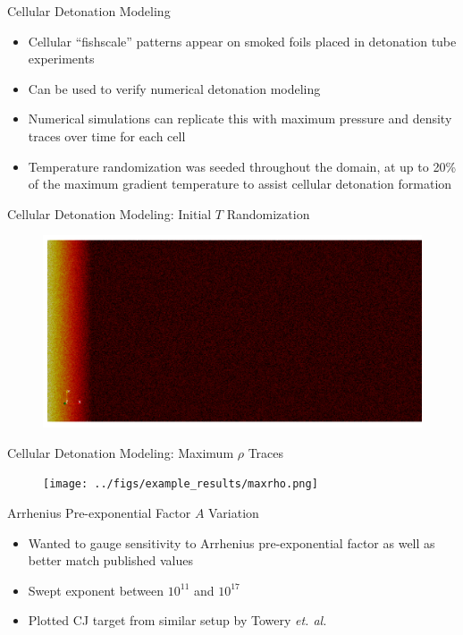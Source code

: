 \begin{frame}{Cellular Detonation Modeling}
\begin{itemize}
\item Cellular ``fishscale'' patterns appear on smoked foils placed in detonation tube experiments
\item Can be used to verify numerical detonation modeling 
\item Numerical simulations can replicate this with maximum pressure and density traces over time for each cell
\item Temperature randomization was seeded throughout the domain, at up to 20\% of the maximum gradient temperature to assist cellular detonation formation 
\end{itemize}
\end{frame}

\begin{frame}{Cellular Detonation Modeling: Initial $T$ Randomization}
\begin{figure}[]
\centering
\includegraphics[width=\textwidth]{../figs/ignition/randgrad.png}
\end{figure}
\end{frame}

\begin{frame}{Cellular Detonation Modeling: Maximum $\rho$ Traces}
\begin{figure}[]
\centering
\texttt{[image: ../figs/example\_results/maxrho.png]}
\end{figure}
\end{frame}

\begin{frame}{Arrhenius Pre-exponential Factor $A$ Variation}
\begin{itemize}
\item Wanted to gauge sensitivity to Arrhenius pre-exponential factor as well as better match published values 
\item Swept exponent between $10^{11}$ and $10^{17}$ 
\item Plotted CJ target from similar setup by Towery \textit{et. al.} \cite{towery1}
\end{itemize}
\end{frame}


